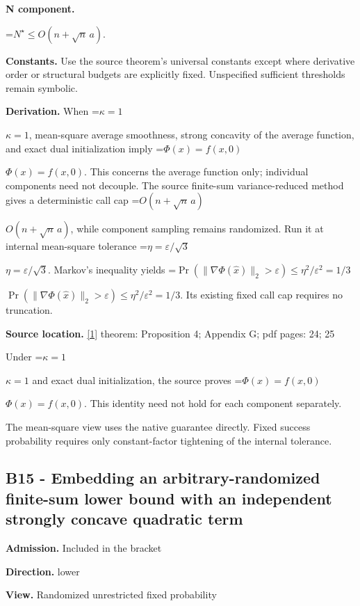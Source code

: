 \documentclass[10pt,a4paper]{article}
\newcommand{\AtlasMath}[1]{\par\begingroup\centering\setbox0=\hbox{$\displaystyle #1$}\ifdim\wd0>1.4\linewidth\typeout{ATLAS WIDE FORMULA: \the\wd0}\fi\ifdim\wd0>\linewidth\resizebox{\linewidth}{!}{\box0}\else\box0\fi\par\endgroup}
\newcommand{\AtlasInlineMath}[1]{\begingroup\setbox0=\hbox{$#1$}\ifdim\wd0>.4\linewidth\endgroup\AtlasMath{#1}\else\endgroup$#1$\fi}
\begin{document}
\textbf{N component.}



\AtlasMath{N^\star\le O(n+\sqrt n\,a).}


\textbf{Constants.} Use the source theorem’s universal constants except where derivative order or structural budgets are explicitly fixed. Unspecified sufficient thresholds remain symbolic.



\textbf{Derivation.} When \AtlasInlineMath{\kappa=1}, mean-square average smoothness, strong concavity of the average function, and exact dual initialization imply \AtlasInlineMath{\Phi(x)=f(x,0)}. This concerns the average function only; individual components need not decouple. The source finite-sum variance-reduced method gives a deterministic call cap \AtlasInlineMath{O(n+\sqrt n\,a)}, while component sampling remains randomized. Run it at internal mean-square tolerance \AtlasInlineMath{\eta=\varepsilon/\sqrt3}. Markov's inequality yields \AtlasInlineMath{\Pr(\|\nabla\Phi(\widehat x)\|_2>\varepsilon)\le\eta^2/\varepsilon^2=1/3}. Its existing fixed call cap requires no truncation.



\textbf{Source location.} \href{https://arxiv.org/pdf/2610.04944v1}{[1]} theorem: Proposition 4; Appendix G; pdf pages: 24; 25



Under \AtlasInlineMath{\kappa=1} and exact dual initialization, the source proves \AtlasInlineMath{\Phi(x)=f(x,0)}. This identity need not hold for each component separately.



The mean-square view uses the native guarantee directly. Fixed success probability requires only constant-factor tightening of the internal tolerance.



\subsection{B15 - Embedding an arbitrary-randomized finite-sum lower bound with an independent strongly concave quadratic term}


\textbf{Admission.} Included in the bracket



\textbf{Direction.} lower



\textbf{View.} Randomized unrestricted fixed probability
\end{document}
